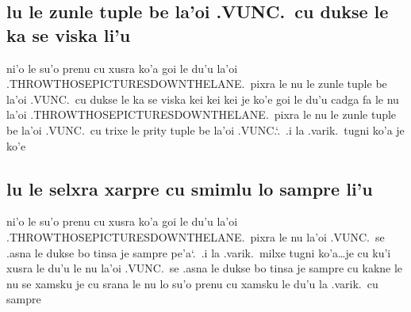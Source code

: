 \documentclass{report}
\newcommand\sds{\spacefactor\sfcode`.\ \space}
\begin{document}
\subsection{lu le zunle tuple be la'oi .VUNC.\ cu dukse le ka se viska li'u}
ni'o le su'o prenu cu xusra ko'a goi le du'u la'oi .THROWTHOSEPICTURESDOWNTHELANE.\ pixra le nu le zunle tuple be la'oi .VUNC.\ cu dukse le ka se viska kei kei kei je ko'e goi le du'u cadga fa le nu la'oi .THROWTHOSEPICTURESDOWNTHELANE.\ pixra le nu le zunle tuple be la'oi .VUNC.\ cu trixe le prity tuple be la'oi .VUNC.\sds  .i la .varik.\ tugni ko'a je ko'e

\subsection{lu le selxra xarpre cu smimlu lo sampre li'u}
ni'o le su'o prenu cu xusra ko'a goi le du'u la'oi .THROWTHOSEPICTURESDOWNTHELANE.\ pixra le nu la'oi .VUNC.\ se .asna le dukse bo tinsa je sampre pe'a\sds  .i la .varik.\ milxe tugni ko'a\ldots je cu ku'i xusra le du'u le nu la'oi .VUNC.\ se .asna le dukse bo tinsa je sampre cu kakne le nu se xamsku je cu srana le nu lo su'o prenu cu xamsku le du'u la .varik.\ cu sampre
\end{document}

